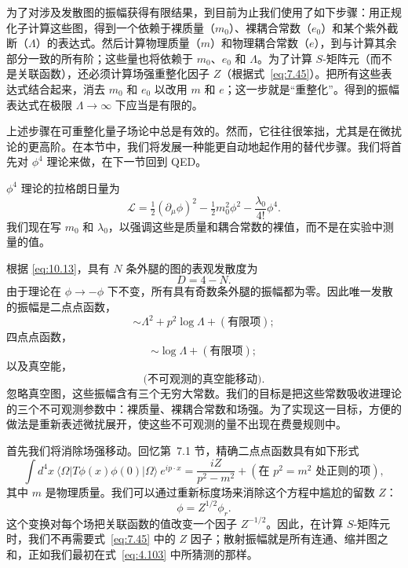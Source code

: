 为了对涉及发散图的振幅获得有限结果，到目前为止我们使用了如下步骤：用正规化子计算这些图，得到一个依赖于裸质量（$m_0$）、裸耦合常数（$e_0$）和某个紫外截断（$\Lambda$）的表达式。然后计算物理质量（$m$）和物理耦合常数（$e$），到与计算其余部分一致的所有阶；这些量也将依赖于 $m_0$、$e_0$ 和 $\Lambda$。为了计算 $S$-矩阵元（而不是关联函数），还必须计算场强重整化因子 $Z$（根据式~\eqref{eq:7.45}）。把所有这些表达式结合起来，消去 $m_0$ 和 $e_0$ 以改用 $m$ 和 $e$；这一步就是``重整化''。得到的振幅表达式在极限 $\Lambda\to\infty$ 下应当是有限的。

上述步骤在可重整化量子场论中总是有效的。然而，它往往很笨拙，尤其是在微扰论的更高阶。在本节中，我们将发展一种能更自动地起作用的替代步骤。我们将首先对 $\phi^4$ 理论来做，在下一节回到 QED。

$\phi^4$ 理论的拉格朗日量为
\begin{equation}
  \mathcal{L} = \tfrac{1}{2}(\partial_\mu\phi)^2 - \tfrac{1}{2}m_0^2\phi^2
    - \frac{\lambda_0}{4!}\phi^4 .
\end{equation}
我们现在写 $m_0$ 和 $\lambda_0$，以强调这些是质量和耦合常数的裸值，而不是在实验中测量的值。

根据 \eqref{eq:10.13}，具有 $N$ 条外腿的图的表观发散度为
\begin{equation}
  D = 4 - N .
\end{equation}
由于理论在 $\phi\to-\phi$ 下不变，所有具有奇数条外腿的振幅都为零。因此唯一发散的振幅是二点点函数，
\begin{equation}
  \sim \Lambda^2 + p^2\log\Lambda + (\text{有限项}) ;
\end{equation}
四点点函数，
\begin{equation}
  \sim \log\Lambda + (\text{有限项}) ;
\end{equation}
以及真空能，
\begin{equation}
  \text{(不可观测的真空能移动)} .
\end{equation}
忽略真空图，这些振幅含有三个无穷大常数。我们的目标是把这些常数吸收进理论的三个不可观测参数中：裸质量、裸耦合常数和场强。为了实现这一目标，方便的做法是重新表述微扰展开，使这些不可观测的量不出现在费曼规则中。

首先我们将消除场强移动。回忆第~7.1 节，精确二点点函数具有如下形式
\begin{equation}
  \int d^4x\ \langle\Omega|T\phi(x)\phi(0)|\Omega\rangle\ e^{ip\cdot x}
  = \frac{iZ}{p^2-m^2} + (\text{在 } p^2 = m^2 \text{ 处正则的项}),
  \label{eq:10.14}
\end{equation}
其中 $m$ 是物理质量。我们可以通过重新标度场来消除这个方程中尴尬的留数 $Z$：
\begin{equation}
  \phi = Z^{1/2}\phi_r .
  \label{eq:10.15}
\end{equation}
这个变换对每个场把关联函数的值改变一个因子 $Z^{-1/2}$。因此，在计算 $S$-矩阵元时，我们不再需要式~\eqref{eq:7.45} 中的 $Z$ 因子；散射振幅就是所有连通、缩并图之和，正如我们最初在式~\eqref{eq:4.103} 中所猜测的那样。


